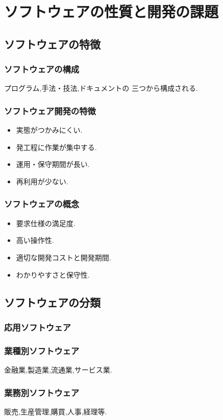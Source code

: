 \documentclass[8pt,twocolumn]{jsarticle}
\begin{document}
\lhead{}
\chead{}
\section{ソフトウェアの性質と開発の課題}
\subsection{ソフトウェアの特徴}
\subsubsection{ソフトウェアの構成}
プログラム,手法・技法,ドキュメントの
三つから構成される.
\subsubsection{ソフトウェア開発の特徴}
\begin{itemize}
		\item 実態がつかみにくい.
		\item 発工程に作業が集中する.
		\item 運用・保守期間が長い.
		\item 再利用が少ない.
\end{itemize}
\subsubsection{ソフトウェアの概念}
\begin{itemize}
		\item 要求仕様の満足度.
		\item 高い操作性.
		\item 適切な開発コストと開発期間.
		\item わかりやすさと保守性.
\end{itemize}
\subsection{ソフトウェアの分類}
\subsubsection{応用ソフトウェア}
\subsubsection*{業種別ソフトウェア}
金融業,製造業,流通業,サービス業.
\subsubsection*{業務別ソフトウェア}
販売,生産管理,購買,人事,経理等.
\end{document}
